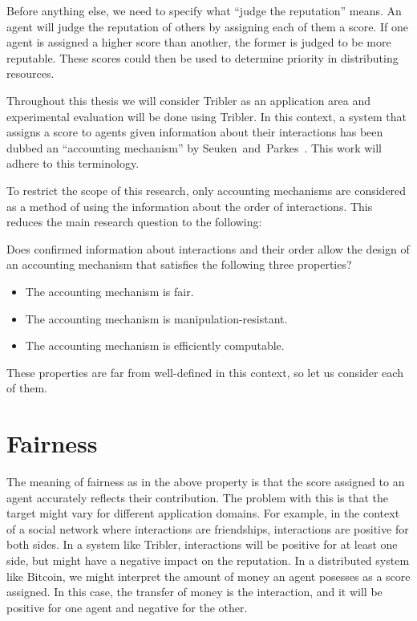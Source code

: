 \documentclass[a4paper,11pt]{book}
\theoremstyle{definition}
\begin{document}
Before anything else, we need to specify what ``judge the reputation'' means.
An agent will judge the reputation of others by assigning each of them a score.
If one agent is assigned a higher score than another, the former is judged to be more
reputable.  These scores could then be used to determine priority in distributing resources.

Throughout this thesis we will consider Tribler as an application area and experimental
evaluation will be done using Tribler. 
In this context, a system that assigns a score
to agents given information about their interactions has been dubbed an 
``accounting mechanism'' by Seuken~and~Parkes~\cite{seuken2010accounting}. This
work will adhere to this terminology.

To restrict the scope of this research, only accounting mechanisms are considered as a method
of using the information about the order of interactions. This reduces the main research question
to the following:

\begin{center}
    Does confirmed information about interactions and their order allow the design of an accounting mechanism
    that satisfies the following three properties?
\end{center}

\begin{itemize}
    \item The accounting mechanism is fair. 
    \item The accounting mechanism is manipulation-resistant.
    \item The accounting mechanism is efficiently computable.
\end{itemize}

These properties are far from well-defined in this context, so let us consider each of them.

\section{Fairness}

The meaning of fairness as in the above property is that the score assigned to an agent
accurately reflects their contribution. The problem with this is that the target might
vary for different application domains. For example, in the context of a social
network where interactions are friendships, interactions are positive for both sides.
In a system like Tribler, interactions will be positive for at least one side, but
might have a negative impact on the reputation. In a distributed system like Bitcoin,
we might interpret the amount of money an agent posesses as a score assigned. In
this case, the transfer of money is the interaction, and it will be positive for one
agent and negative for the other.
\end{document}
